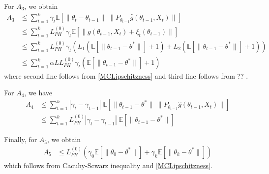 \documentclass[a4paper]{article}
\newcommand{\norm}[1]{\|#1 \|}
\newcommand{\Exs}{\mathbb{E}}
\newcommand{\thetastar}{\theta^*}
\newcommand{\constLPH}[1]{L_{PH}^{(#1)}}
\newcommand{\stepsize}{\alpha}
\begin{document}
	For $A_{3}$, we obtain
	\begin{align*}
		A_{3} & \le \sum_{t = 1}^{k}\gamma_{t}\Exs\left[\norm{\theta_{t} - \theta_{t - 1}} \; \norm{P_{\theta_{t - 1}}\hat{g}\left(\theta_{t - 1}, X_{t}\right)}\right]\\
		& \le \sum_{t = 1}^{k} \constLPH{0}\gamma_{t}\Exs\left[\norm{g\left(\theta_{t - 1}, X_{t}\right)‌ + \xi_{t}(\theta_{t - 1})}\right]\\
		& \le \sum_{t = 1}^{k}\constLPH{0}\gamma_{t}\left(L_{1}\left(\Exs\left[\norm{\theta_{t - 1} - \thetastar}\right] + 1\right) + L_{2}\left(\Exs\left[\norm{\theta_{t - 1} - \thetastar}\right] + 1\right)\right)\\
		& \leq \sum_{t = 1}^{k}\stepsize L \constLPH{0}\gamma_{t}\left(\Exs\left[\norm{\theta_{t - 1} - \thetastar}\right] + 1\right)
	\end{align*}
	where second line follows from \ref{MCLipschitzness} and third line follows from ?? .
	
	For $A_{4}$, we have
	\begin{align*}
		A_{4} & \le \sum_{t = 1}^{k}|\gamma_{t} - \gamma_{t - 1}|\; \Exs\left[\norm{\theta_{t - 1} - \thetastar} \; \norm{P_{\theta_{t - 1}}\hat{g}\left(\theta_{t- 1}, X_{t}\right)}\right]\\
		& \le \sum_{t = 1}^{k}\constLPH{0}|\gamma_{t} - \gamma_{t - 1}| \; \Exs\left[\norm{\theta_{t - 1} - \thetastar}\right]
	\end{align*}
	
	Finally, for $A_{5}$, we obtain
	\begin{align*}
		A_{5} & \le \constLPH{0}\left(\gamma_{0}\Exs\left[\norm{\theta_{0} - \thetastar}\right] + \gamma_{k}\Exs\left[\norm{\theta_{k} - \thetastar}\right]\right)
	\end{align*}
	which follows from Cacuhy-Scwarz inequality and \ref{MCLipschitzness}.
	
\end{document}
